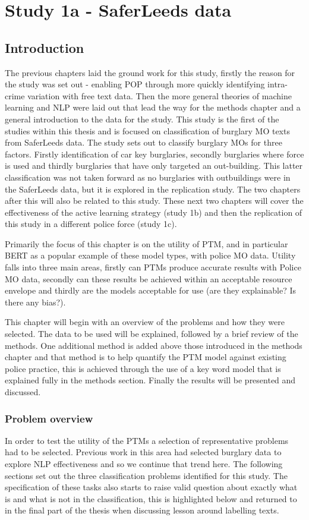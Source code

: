 \chapter{Study 1a - SaferLeeds data}
\section{Introduction}

The previous chapters laid the ground work for this study, firstly the reason for the study was set out -  enabling POP through more quickly identifying intra-crime variation with free text data. Then the more general theories of machine learning and NLP were laid out that lead the way for the methods chapter and a general introduction to the data for the study. This study is the first of the studies within this thesis and is focused on classification of burglary MO texts from SaferLeeds data. The study sets out to classify burglary MOs for three factors. Firstly identification of car key burglaries, secondly burglaries where force is used and thirdly burglaries that have only targeted an out-building. This latter classification was not taken forward as no burglaries with outbuildings were in the  SaferLeeds data, but it is explored in the replication study. The two chapters after this will also be related to this study. These next two chapters will cover the effectiveness of the active learning strategy (study 1b)  and then the replication of this study in a different police force (study 1c).      


Primarily the focus of this chapter is on the utility of PTM, and in particular BERT as a popular example of these model types, with police MO data. Utility falls into three main areas, firstly can PTMs produce accurate results with Police MO data, secondly can these results be achieved within an acceptable resource envelope and thirdly are the models acceptable for use (are they explainable? Is there any bias?). 

This chapter will begin with an overview of the problems and how they were selected. The data to be used will be explained, followed by a brief review of the methods. One additional method is added above those introduced in the methods chapter and that method is to help quantify the PTM model against existing police practice, this is achieved through the use of a key word model that is explained fully in the methods section. Finally the results will be presented and discussed.


\subsection{Problem overview} In order to test the utility of the PTMs a selection of representative problems had to be selected. Previous work in this area had selected burglary data \parencite{birks, sheard2020developing } to explore NLP effectiveness and so we continue that trend here. The following sections set out the three classification problems identified for this study. The specification of these tasks also starts to raise valid question about exactly what is and what is not in the classification, this is highlighted below and returned to in the final part of the thesis when discussing lesson around labelling texts. 

